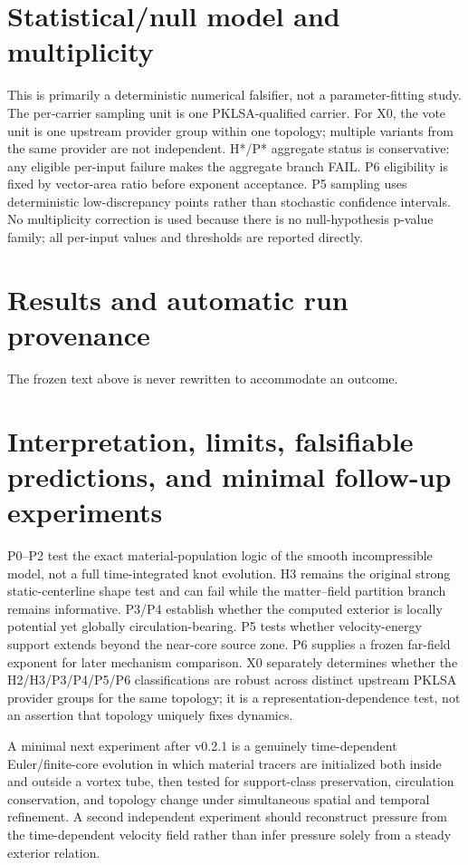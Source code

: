 \documentclass[11pt,a4paper]{article}
\begin{document}
\section{Statistical/null model and multiplicity}
This is primarily a deterministic numerical falsifier, not a parameter-fitting study. The per-carrier sampling unit is one PKLSA-qualified carrier. For X0, the vote unit is one upstream provider group within one topology; multiple variants from the same provider are not independent. H*/P* aggregate status is conservative: any eligible per-input failure makes the aggregate branch FAIL. P6 eligibility is fixed by vector-area ratio before exponent acceptance. P5 sampling uses deterministic low-discrepancy points rather than stochastic confidence intervals. No multiplicity correction is used because there is no null-hypothesis p-value family; all per-input values and thresholds are reported directly.

\section{Results and automatic run provenance}
The frozen text above is never rewritten to accommodate an outcome.

\section{Interpretation, limits, falsifiable predictions, and minimal follow-up experiments}
P0--P2 test the exact material-population logic of the smooth incompressible model, not a full time-integrated knot evolution. H3 remains the original strong static-centerline shape test and can fail while the matter--field partition branch remains informative. P3/P4 establish whether the computed exterior is locally potential yet globally circulation-bearing. P5 tests whether velocity-energy support extends beyond the near-core source zone. P6 supplies a frozen far-field exponent for later mechanism comparison. X0 separately determines whether the H2/H3/P3/P4/P5/P6 classifications are robust across distinct upstream PKLSA provider groups for the same topology; it is a representation-dependence test, not an assertion that topology uniquely fixes dynamics.

A minimal next experiment after v0.2.1 is a genuinely time-dependent Euler/finite-core evolution in which material tracers are initialized both inside and outside a vortex tube, then tested for support-class preservation, circulation conservation, and topology change under simultaneous spatial and temporal refinement. A second independent experiment should reconstruct pressure from the time-dependent velocity field rather than infer pressure solely from a steady exterior relation.
\end{document}
